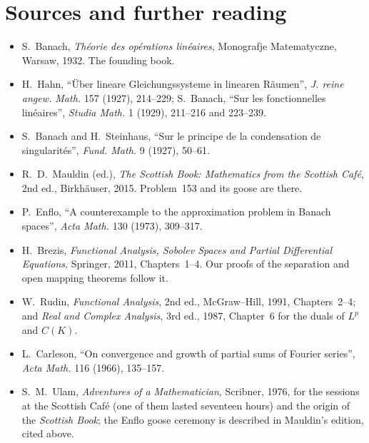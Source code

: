 \section*{Sources and further reading}

\begin{itemize}
\item S.~Banach, \emph{Th\'eorie des op\'erations lin\'eaires}, Monografje Matematyczne, Warsaw, 1932. The founding book.
\item H.~Hahn, ``\"Uber lineare Gleichungssysteme in linearen R\"aumen'', \emph{J. reine angew. Math.} 157 (1927), 214--229; S.~Banach, ``Sur les fonctionnelles lin\'eaires'', \emph{Studia Math.} 1 (1929), 211--216 and 223--239.
\item S.~Banach and H.~Steinhaus, ``Sur le principe de la condensation de singularit\'es'', \emph{Fund. Math.} 9 (1927), 50--61.
\item R.~D.~Mauldin (ed.), \emph{The Scottish Book: Mathematics from the Scottish Caf\'e}, 2nd ed., Birkh\"auser, 2015. Problem~153 and its goose are there.
\item P.~Enflo, ``A counterexample to the approximation problem in Banach spaces'', \emph{Acta Math.} 130 (1973), 309--317.
\item H.~Brezis, \emph{Functional Analysis, Sobolev Spaces and Partial Differential Equations}, Springer, 2011, Chapters~1--4. Our proofs of the separation and open mapping theorems follow it.
\item W.~Rudin, \emph{Functional Analysis}, 2nd ed., McGraw--Hill, 1991, Chapters~2--4; and \emph{Real and Complex Analysis}, 3rd ed., 1987, Chapter~6 for the duals of $L^p$ and $C(K)$.
\item L.~Carleson, ``On convergence and growth of partial sums of Fourier series'', \emph{Acta Math.} 116 (1966), 135--157.
\item S.~M.~Ulam, \emph{Adventures of a Mathematician}, Scribner, 1976, for the sessions at the Scottish Caf\'e (one of them lasted seventeen hours) and
the origin of the \emph{Scottish Book}; the Enflo goose ceremony is described in Mauldin's edition, cited above.
\end{itemize}
